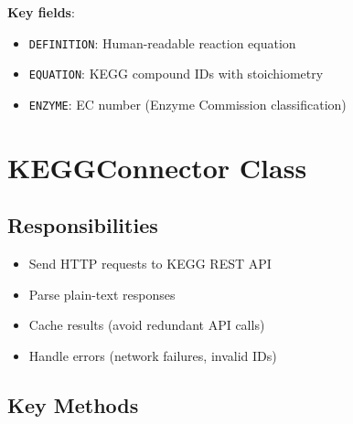 \textbf{Key fields}:

\begin{itemize}
    \item \texttt{DEFINITION}: Human-readable reaction equation
    \item \texttt{EQUATION}: KEGG compound IDs with stoichiometry
    \item \texttt{ENZYME}: EC number (Enzyme Commission classification)
\end{itemize}

\section{KEGGConnector Class}
\label{sec:kegg-connector}

\subsection{Responsibilities}
\label{subsec:kegg-connector-responsibilities}

\begin{itemize}
    \item Send HTTP requests to KEGG REST API
    \item Parse plain-text responses
    \item Cache results (avoid redundant API calls)
    \item Handle errors (network failures, invalid IDs)
\end{itemize}

\subsection{Key Methods}
\label{subsec:kegg-connector-methods}

